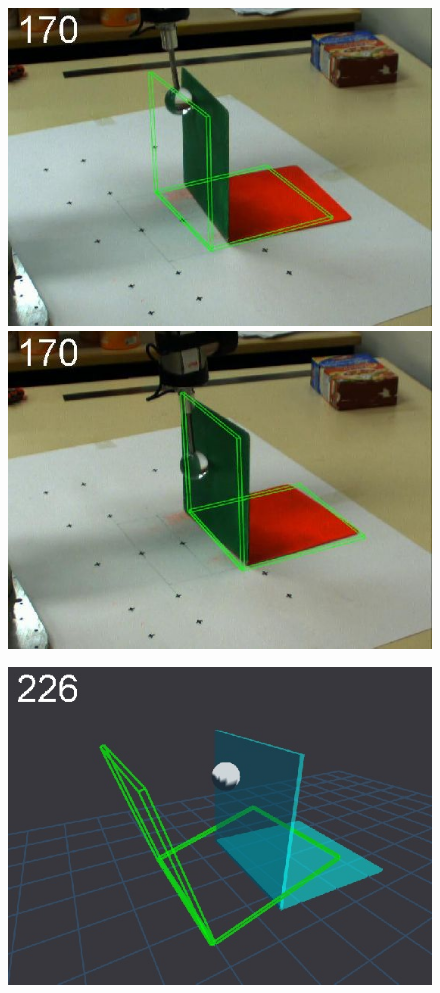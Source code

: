 \begin{figure}[tb]
{\includegraphics[width=\imgBXwid]{./B2_LWPR1_58_2}
\includegraphics[width=\imgBXwid]{./B2_2exp_38_2}
}
\centerline{
\includegraphics[width=\imgBXwid]{./B1_1exp_20_3}
}
\end{figure}
